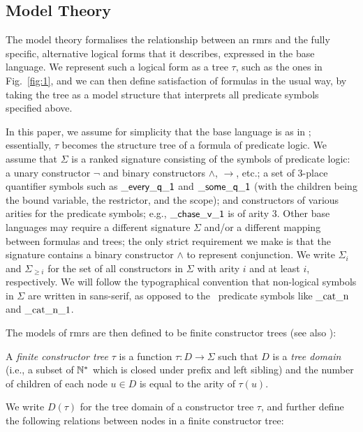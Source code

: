 \subsection{Model Theory} \label{sec:model-theory}

The model theory formalises the relationship between an {\sc rmrs} and
the fully specific, alternative logical forms that it describes,
expressed in the base language.  We represent such a logical form as a
tree $\tau$, such as the ones in Fig.~\ref{fig:1}, and we can then
define satisfaction of formulas in the usual way, by taking the tree
as a model structure that interprets all predicate symbols specified
above.

In this paper, we assume for simplicity that the base language is as
in \mrs; essentially, $\tau$ becomes the structure tree of a formula
of predicate logic.  We assume that $\Sigma$ is a ranked signature
consisting of the symbols of predicate logic: a unary constructor
$\neg$ and binary constructors $\wedge$, $\rightarrow$, etc.; a set of
3-place quantifier symbols such as $\mathsf{\_every\_q\_1}$ and
$\mathsf{\_some\_q\_1}$ (with the children being the bound variable, the
restrictor, and the scope); and constructors of various arities for
the predicate symbols; e.g., $\mathsf{\_chase\_v\_1}$ is of arity 3.
Other base languages may require a different signature $\Sigma$ and/or
a different mapping between formulas and trees; the only strict
requirement we make is that the signature contains a binary
constructor $\wedge$ to represent conjunction.  We write $\Sigma_i$
and $\Sigma_{\geq i}$ for the set of all constructors in $\Sigma$ with
arity $i$ and at least $i$, respectively.  We will follow the
typographical convention that non-logical symbols in $\Sigma$ are
written in \textsf{sans-serif}, as opposed to the \rmrs\ predicate
symbols like $\mathrm{\_cat\_n}$ and $\mathrm{\_cat\_n\_1}$.

The models of {\sc rmrs} are then defined to be finite constructor
trees (see also \cite{egg:etal:2001}):
\begin{definition}\label{defn:models}
  A {\em finite constructor tree} $\tau$ is a function $\tau:D
  \rightarrow \Sigma$ such that $D$ is a \emph{tree domain} (i.e., a
  subset of $\mathbb{N}^*$ which is closed under prefix and left sibling) and
  the number of children of each node $u \in D$ is equal to the arity
  of $\tau(u)$.  
\end{definition}

We write $D(\tau)$ for the tree domain of a constructor tree $\tau$,
and further define the following relations between nodes in a finite
constructor tree:

